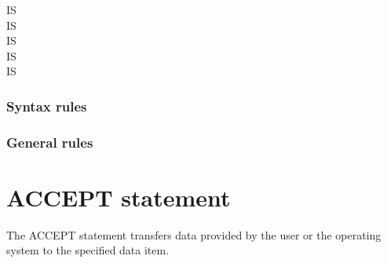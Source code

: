 \begin{syntax}[\gnucobolcolour]
  \begin{1=}
     IS  \\
     IS  \\
     IS \integer \\
      IS  \\
      IS \integer
  \end{1=}
\end{syntax}

\subsubsection{Syntax rules}

\subsubsection{General rules}

\section{ACCEPT statement}

The ACCEPT statement transfers data provided by the user or the operating system to the specified data item.

\begin{syntax}
  \begin{1=}
    \identifier \\
  \end{1=}
  \begin{0-1}
     \mnemonicname
  \end{0-1}
  \begin{0-1}
  \end{0-1}
\end{syntax}

